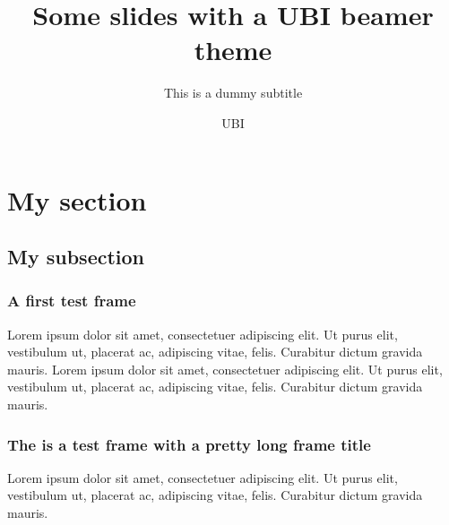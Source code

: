 \documentclass[pdflatex,compress]{beamer}
\title{Some slides with a UBI beamer theme}
\subtitle{This is a dummy subtitle}
\author{UBI}
\begin{document}
\maketitle

\section{My section}
\subsection{My subsection}

\begin{frame}
\frametitle{A first test frame}

Lorem ipsum dolor sit amet, consectetuer adipiscing elit. Ut purus
elit, vestibulum ut, placerat ac, adipiscing vitae, felis. Curabitur
dictum gravida mauris.
Lorem ipsum dolor sit amet, consectetuer adipiscing elit. Ut purus
elit, vestibulum ut, placerat ac, adipiscing vitae, felis. Curabitur
dictum gravida mauris.

\end{frame}



\begin{frame}

\frametitle{The is a test frame with a pretty long frame title}
Lorem ipsum dolor sit amet, consectetuer adipiscing elit. Ut purus
elit, vestibulum ut, placerat ac, adipiscing vitae, felis. Curabitur
dictum gravida mauris.

\end{frame}
\end{document}
